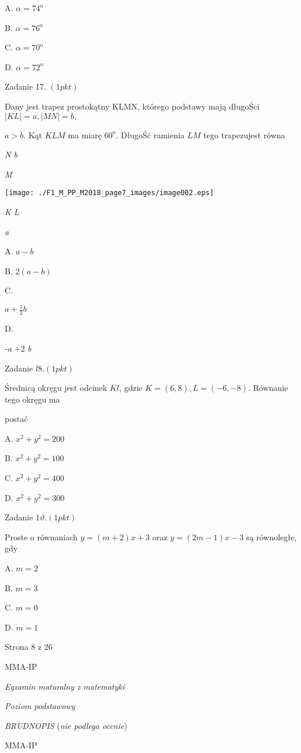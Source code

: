 \documentclass[a4paper,12pt]{article}
\begin{document}
A. $\alpha=74^{\mathrm{o}}$

B. $\alpha=76^{\mathrm{o}}$

C. $\alpha=70^{\mathrm{o}}$

D. $\alpha=72^{\mathrm{o}}$

Zadanie 17. $(1pkt)$

Dany jest trapez prostokątny KLMN, którego podstawy mają długoŚci $|KL|=a, |MN|=b,$

$a>b$. Kąt $KLM$ ma miarę $60^{\mathrm{o}}$. DługoŚć ramienia $LM$ tego trapezujest równa

{\it N b}

{\it M}
\begin{center}
\texttt{[image: ./F1\_M\_PP\_M2018\_page7\_images/image002.eps]}
\end{center}
{\it K  L}

{\it a}

A. $a-b$

B. $2(a-b)$

C.

$a+\displaystyle \frac{1}{2}b$

D.

-{\it a} $+$2 {\it b}

Zadanie $l8.(1pkt)$

Średnicą okręgu jest odcinek $Kl$, gdzie $K=(6,8), L=(-6,-8)$. Równanie tego okręgu ma

postać

A. $x^{2}+y^{2}=200$

B. $x^{2}+y^{2}=100$

C. $x^{2}+y^{2}=400$

D. $x^{2}+y^{2}=300$

Zadanie $1\vartheta. (1pkt)$

Proste o równaniach $y=(m+2)x+3$ oraz $y=(2m-1)x-3$ są równoległe, gdy

A. $m=2$

B. $m=3$

C. $m=0$

D. $m=1$

Strona 8 z 26

MMA-IP





{\it Egzamin maturalny z matematyki}

{\it Poziom podstawowy}

{\it BRUDNOPIS} ({\it nie podlega ocenie})

MMA-IP
\end{document}
